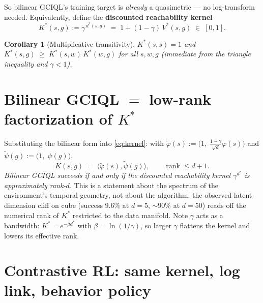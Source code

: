 \documentclass[10pt]{article}
\newtheorem{corollary}{Corollary}
\newcommand{\ip}[2]{\langle #1, #2 \rangle}
\begin{document}
So bilinear GCIQL's training target is \emph{already} a quasimetric --- no log-transform needed. Equivalently, define the \textbf{discounted reachability kernel}
\begin{equation}
K^*(s,g) := \gamma^{\,d^*(s,g)} \;=\; 1 + (1-\gamma)\,V^*(s,g) \;\in\; [0,1].
\label{eq:kernel}
\end{equation}

\begin{corollary}[Multiplicative transitivity]\label{cor:mult}
$K^*(s,s)=1$ and $K^*(s,g) \;\ge\; K^*(s,w)\,K^*(w,g)$ for all $s,w,g$ (immediate from the triangle inequality and $\gamma<1$).
\end{corollary}

\section{Bilinear GCIQL $=$ low-rank factorization of $K^*$}

Substituting the bilinear form into \eqref{eq:kernel}: with $\tilde\varphi(s) := \big(1,\; \tfrac{1-\gamma}{\sqrt d}\varphi(s)\big)$ and $\tilde\psi(g) := \big(1,\; \psi(g)\big)$,
\begin{equation}
K(s,g) \;=\; \ip{\tilde\varphi(s)}{\tilde\psi(g)}, \qquad \operatorname{rank} \le d+1 .
\label{eq:factorization}
\end{equation}
\emph{Bilinear GCIQL succeeds if and only if the discounted reachability kernel $\gamma^{d^*}$ is approximately rank-$d$.} This is a statement about the spectrum of the environment's temporal geometry, not about the algorithm: the observed latent-dimension cliff on cube (success $9.6\%$ at $d{=}5$, $\sim 90\%$ at $d{=}50$) reads off the numerical rank of $K^*$ restricted to the data manifold. Note $\gamma$ acts as a bandwidth: $K^* = e^{-\beta d^*}$ with $\beta = \ln(1/\gamma)$, so larger $\gamma$ flattens the kernel and lowers its effective rank.

\section{Contrastive RL: same kernel, log link, behavior policy}
\end{document}
